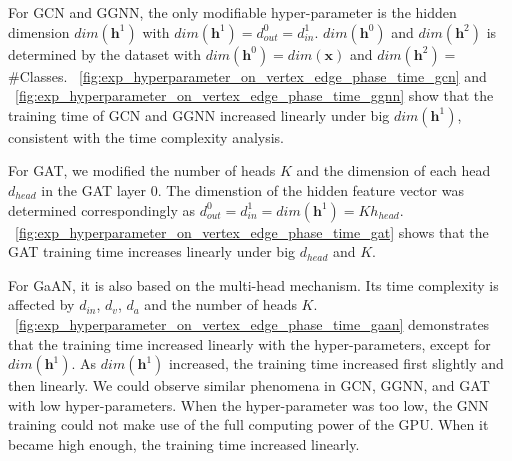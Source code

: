 For GCN and GGNN, the only modifiable hyper-parameter is the hidden dimension $dim(\boldsymbol{h}^1)$ with $dim(\boldsymbol{h}^1) = d^0_{out} = d^1_{in}$.
$dim(\boldsymbol{h}^0)$ and $dim(\boldsymbol{h}^2)$ is determined by the dataset with $dim(\boldsymbol{h}^0)=dim(\boldsymbol{x})$ and $dim(\boldsymbol{h}^2)=$\#Classes.
\figurename~\ref{fig:exp_hyperparameter_on_vertex_edge_phase_time_gcn} and \figurename~\ref{fig:exp_hyperparameter_on_vertex_edge_phase_time_ggnn} show that the training time of GCN and GGNN increased linearly under big $dim(\boldsymbol{h}^1)$, consistent with the time complexity analysis.

For GAT, we modified the number of heads $K$ and the dimension of each head $d_{head}$ in the GAT layer 0.
The dimenstion of the hidden feature vector was determined correspondingly as $d^0_{out} = d^1_{in} = dim(\boldsymbol{h}^1) = K h_{head}$.
\figurename~\ref{fig:exp_hyperparameter_on_vertex_edge_phase_time_gat} shows that the GAT training time increases linearly under big $d_{head}$ and $K$.

For GaAN, it is also based on the multi-head mechanism.
Its time complexity is affected by $d_{in}$, $d_v$, $d_a$ and the number of heads $K$.
\figurename~\ref{fig:exp_hyperparameter_on_vertex_edge_phase_time_gaan} demonstrates that the training time increased linearly with the hyper-parameters, except for $dim(\boldsymbol{h}^1)$.
As $dim(\boldsymbol{h}^1)$ increased, the training time increased first slightly and then linearly.
We could observe similar phenomena in GCN, GGNN, and GAT with low hyper-parameters.
When the hyper-parameter was too low, the GNN training could not make use of the full computing power of the GPU.
When it became high enough, the training time increased linearly.

